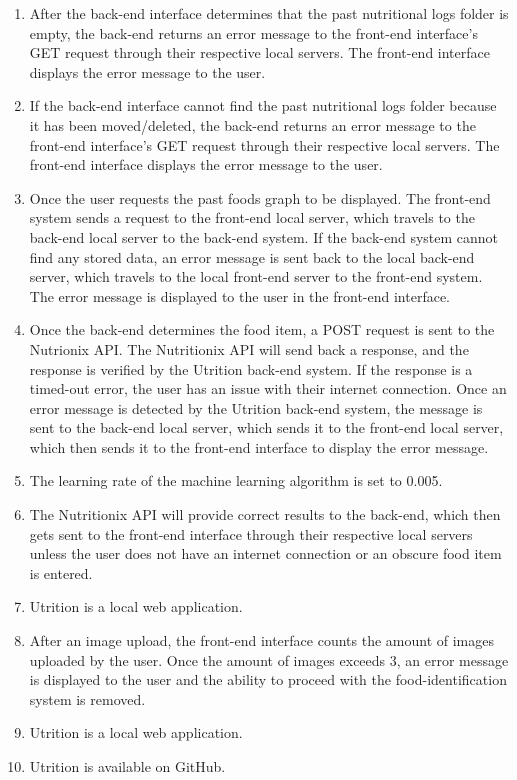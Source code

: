 \documentclass[12pt, titlepage]{article}
\begin{document}
\begin{enumerate}[{PR}1. ]
	\item After the back-end interface determines that the past nutritional logs folder is empty, the back-end returns an error message to the front-end interface's GET request through their respective local servers. The front-end interface displays the error message to the user.
	\item If the back-end interface cannot find the past nutritional logs folder because it has been moved/deleted, the back-end returns an error message to the front-end interface's GET request through their respective local servers. The front-end interface displays the error message to the user.
	\item Once the user requests the past foods graph to be displayed. The front-end system sends a request to the front-end local server, which travels to the back-end local server to the back-end system. If the back-end system cannot find any stored data, an error message is sent back to the local back-end server, which travels to the local front-end server to the front-end system. The error message is displayed to the user in the front-end interface.
	\item Once the back-end determines the food item, a POST request is sent to the Nutrionix API. The Nutritionix API will send back a response, and the response is verified by the Utrition back-end system. If the response is a timed-out error, the user has an issue with their internet connection. Once an error message is detected by the Utrition back-end system, the message is sent to the back-end local server, which sends it to the front-end local server, which then sends it to the front-end interface to display the error message.
	\item The learning rate of the machine learning algorithm is set to 0.005.
	\item The Nutritionix API will provide correct results to the back-end, which then gets sent to the front-end interface through their respective local servers unless the user does not have an internet connection or an obscure food item is entered.
	\item Utrition is a local web application.
	\item After an image upload, the front-end interface counts the amount of images uploaded by the user. Once the amount of images exceeds 3, an error message is displayed to the user and the ability to proceed with the food-identification system is removed.
	\item Utrition is a local web application.
	\item Utrition is available on GitHub.
\end{enumerate}
\end{document}
